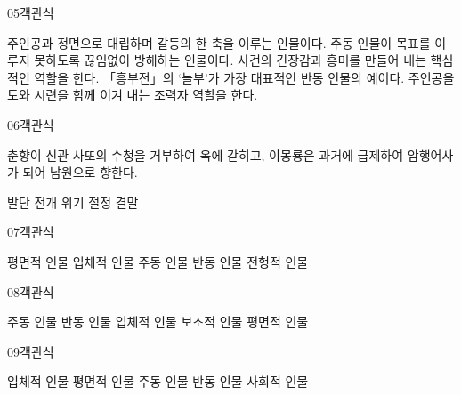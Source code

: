 \documentclass[fs9,seriesRus]{korfarm-base}
\begin{document}
\begin{kfQBlock}{05}{객관식}
\begin{kfChoices}
\kfChoice 주인공과 정면으로 대립하며 갈등의 한 축을 이루는 인물이다.
\kfChoice 주동 인물이 목표를 이루지 못하도록 끊임없이 방해하는 인물이다.
\kfChoice 사건의 긴장감과 흥미를 만들어 내는 핵심적인 역할을 한다.
\kfChoice 「흥부전」의 ‘놀부’가 가장 대표적인 반동 인물의 예이다.
\kfChoice 주인공을 도와 시련을 함께 이겨 내는 조력자 역할을 한다.
\end{kfChoices}
\end{kfQBlock}
\begin{kfQBlock}{06}{객관식}
\begin{kfEvidence}춘향이 신관 사또의 수청을 거부하여 옥에 갇히고, 이몽룡은 과거에 급제하여 암행어사가 되어 남원으로 향한다.\end{kfEvidence}
\begin{kfChoices}
\kfChoice 발단
\kfChoice 전개
\kfChoice 위기
\kfChoice 절정
\kfChoice 결말
\end{kfChoices}
\end{kfQBlock}
\begin{kfQBlock}{07}{객관식}
\begin{kfChoices}
\kfChoice 평면적 인물
\kfChoice 입체적 인물
\kfChoice 주동 인물
\kfChoice 반동 인물
\kfChoice 전형적 인물
\end{kfChoices}
\end{kfQBlock}
\begin{kfQBlock}{08}{객관식}
\begin{kfChoices}
\kfChoice 주동 인물
\kfChoice 반동 인물
\kfChoice 입체적 인물
\kfChoice 보조적 인물
\kfChoice 평면적 인물
\end{kfChoices}
\end{kfQBlock}
\begin{kfQBlock}{09}{객관식}
\begin{kfChoices}
\kfChoice 입체적 인물
\kfChoice 평면적 인물
\kfChoice 주동 인물
\kfChoice 반동 인물
\kfChoice 사회적 인물
\end{kfChoices}
\end{kfQBlock}
\end{document}
